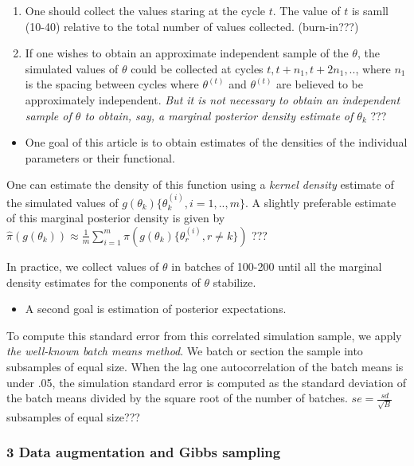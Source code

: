 \documentclass[
]{article}
\providecommand{\tightlist}{%
  \setlength{\itemsep}{0pt}\setlength{\parskip}{0pt}}
\begin{document}
\begin{enumerate}
\def\labelenumi{\arabic{enumi}.}
\item
  One should collect the values staring at the cycle \(t\). The value of
  \(t\) is samll (10-40) relative to the total number of values
  collected. {(burn-in???)}
\item
  If one wishes to obtain an approximate independent sample of the
  \(\theta\), the simulated values of \(\theta\) could be collected at
  cycles \(t,t+n_1,t+2n_1,..\), where \(n_1\) is the spacing between
  cycles where \(\theta^{(t)}\) and \(\theta^{(t)}\) are believed to be
  approximately independent. \emph{But it is not necessary to obtain an
  independent sample of \(\theta\) to obtain, say, a marginal posterior
  density estimate of \(\theta_k\)} {???}
\end{enumerate}

\begin{itemize}
\tightlist
\item
  One goal of this article is to obtain estimates of the densities of
  the individual parameters or their functional.
\end{itemize}

One can estimate the density of this function using a \emph{kernel
density} estimate of the simulated values of
\(g(\theta_k)\{\theta_k^{(i)},i=1,..,m\}\). A slightly preferable
estimate of this marginal posterior density is given by
\(\hat\pi(g(\theta_k))\approx\frac1m\sum_{i=1}^m\pi(g(\theta_k)\{\theta_r^{(i)},r\neq k\})\)
{???}

In practice, we collect values of \(\theta\) in batches of 100-200 until
all the marginal density estimates for the components of \(\theta\)
stabilize.

\begin{itemize}
\tightlist
\item
  A second goal is estimation of posterior expectations.
\end{itemize}

To compute this standard error from this correlated simulation sample,
we apply \emph{the well-known batch means method}. We batch or section
the sample into subsamples of equal size. When the lag one
autocorrelation of the batch means is under .05, the simulation standard
error is computed as the standard deviation of the batch means divided
by the square root of the number of batches. \(se=\frac{sd}{\sqrt{B}}\)
{ subsamples of equal size???}

\hypertarget{data-augmentation-and-gibbs-sampling}{%
\subsubsection{3 Data augmentation and Gibbs
sampling}\label{data-augmentation-and-gibbs-sampling}}
\end{document}
